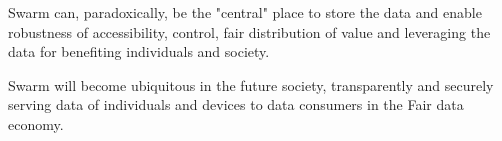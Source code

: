 Swarm can, paradoxically, be the "central" place to store the data and enable robustness of accessibility, control, fair distribution of value and leveraging the data for benefiting individuals and society.

Swarm will become ubiquitous in the future society, transparently and securely serving data of individuals and devices to data consumers in the Fair data economy.

